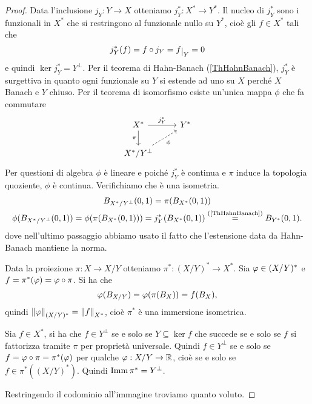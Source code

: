 \begin{proof}
Data l'inclusione $j_Y:Y\to X$ otteniamo $j_Y^\ast:X^\ast\to Y^\ast$. Il nucleo di $j_Y^\ast$ sono i funzionali in $X^\ast$ che si restringono al funzionale nullo su $Y^\ast$, cio\`e gli $f\in X^\ast$ tali che \[j_Y^\ast(f)=f\circ j_Y=f\res Y=0\] e quindi $\ker j_Y^\ast=Y^\perp$. Per il teorema di Hahn-Banach (\ref{ThHahnBanach}), $j_Y^\ast$ \`e surgettiva in quanto ogni funzionale su $Y$ si estende ad uno su $X$ perch\'e $X$ Banach e $Y$ chiuso. Per il teorema di isomorfismo esiste un'unica mappa $\phi$ che fa commutare
\[\begin{tikzcd}
	{X^\ast} & {Y^\ast} \\
	{X^\ast/Y^\perp}
	\arrow["{j_Y^\ast}", from=1-1, to=1-2]
	\arrow["\pi"', from=1-1, to=2-1]
	\arrow["\phi"', dashed, from=2-1, to=1-2]
\end{tikzcd}\]
Per questioni di algebra $\phi$ \`e lineare e poich\'e $j_Y^\ast$ \`e continua e $\pi$ induce la topologia quoziente, $\phi$ \`e continua. Verifichiamo che \`e una isometria.
\begin{gather*}
    B_{X^\ast/Y^\perp}(0,1)=\pi(B_{X^\ast}(0,1))\\
    \phi(B_{X^\ast/Y^\perp}(0,1))=\phi(\pi(B_{X^\ast}(0,1)))=j_Y^\ast(B_{X^\ast}(0,1))\pasgnl={(\ref{ThHahnBanach})}B_{Y^\ast}(0,1).
\end{gather*}
dove nell'ultimo passaggio abbiamo usato il fatto che l'estensione data da Hahn-Banach mantiene la norma.

\bigskip
\noindent
Data la proiezione $\pi:X\to X/Y$ otteniamo $\pi^\ast:(X/Y)^\ast\to X^\ast$.
Sia $\vp\in(X/Y)^\ast$ e $f=\pi^\ast(\vp)=\vp\circ \pi$. Si ha che
\[\vp(B_{X/Y})=\vp(\pi(B_X))=f(B_X),\]
quindi $\norm\vp_{(X/Y)^\ast}=\norm f_{X^\ast}$, cio\`e $\pi^\ast$ \`e una immersione isometrica.

Sia $f\in X^\ast$, si ha che $f\in Y^\perp$ se e solo se $Y\subseteq \ker f$ che succede se e solo se $f$ si fattorizza tramite $\pi$ per propriet\`a universale. Quindi $f\in Y^\perp$ se e solo se $f=\vp\circ \pi=\pi^\ast(\vp)$ per qualche $\vp:X/Y\to \R$, cio\`e se e solo se $f\in \pi^\ast((X/Y)^\ast)$. Quindi $\imm \pi^\ast=Y^\perp$.

Restringendo il codominio all'immagine troviamo quanto voluto.
\end{proof}


